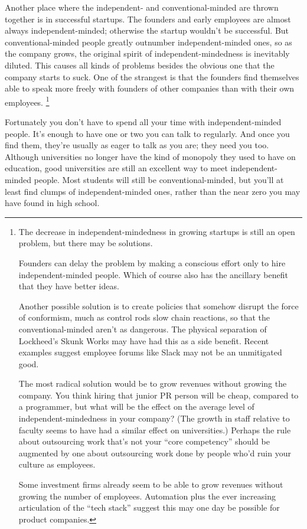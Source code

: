 Another place where the independent- and conventional-minded are thrown
together is in successful startups. The founders and early employees are
almost always independent-minded; otherwise the startup wouldn't be
successful. But conventional-minded people greatly outnumber
independent-minded ones, so as the company grows, the original spirit of
independent-mindedness is inevitably diluted. This causes all kinds of
problems besides the obvious one that the company starts to suck. One of
the strangest is that the founders find themselves able to speak more
freely with founders of other companies than with their own employees.
\footnote{The decrease in independent-mindedness in growing startups is
still an open problem, but there may be solutions.

Founders can delay the problem by making a conscious effort only to hire
independent-minded people. Which of course also has the ancillary
benefit that they have better ideas.

Another possible solution is to create policies that somehow disrupt the
force of conformism, much as control rods slow chain reactions, so that
the conventional-minded aren't as dangerous. The physical separation of
Lockheed's Skunk Works may have had this as a side benefit. Recent
examples suggest employee forums like Slack may not be an unmitigated
good.

The most radical solution would be to grow revenues without growing the
company. You think hiring that junior PR person will be cheap, compared
to a programmer, but what will be the effect on the average level of
independent-mindedness in your company? (The growth in staff relative to
faculty seems to have had a similar effect on universities.) Perhaps the
rule about outsourcing work that's not your ``core competency'' should
be augmented by one about outsourcing work done by people who'd ruin
your culture as employees.

Some investment firms already seem to be able to grow revenues without
growing the number of employees. Automation plus the ever increasing
articulation of the ``tech stack'' suggest this may one day be possible
for product companies.}

Fortunately you don't have to spend all your time with
independent-minded people. It's enough to have one or two you can talk
to regularly. And once you find them, they're usually as eager to talk
as you are; they need you too. Although universities no longer have the
kind of monopoly they used to have on education, good universities are
still an excellent way to meet independent-minded people. Most students
will still be conventional-minded, but you'll at least find clumps of
independent-minded ones, rather than the near zero you may have found in
high school.

